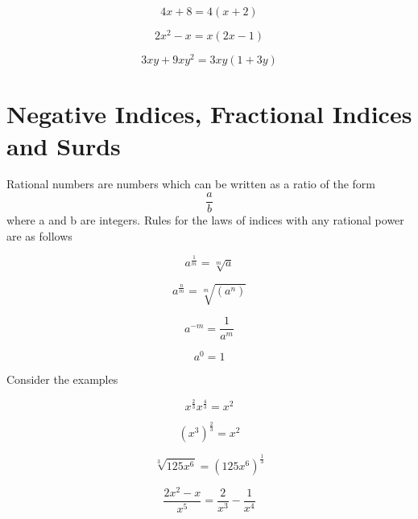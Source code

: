 \documentclass[11pt]{article}
\begin{document}
\begin{tcolorbox}[colback=green!5!white,colframe=green!75!black]
$$  4x+8=4(x+2)   $$\newline

$$  2x^2-x=x(2x-1)  $$\newline

$$  3xy+9xy^2=3xy(1+3y)  $$\newline
\end{tcolorbox}


\section{Negative Indices, Fractional Indices and Surds}\label{S5}
Rational numbers are numbers which can be written as a ratio of the form \newline
$$ \frac{a}{b}$$ where a and b are integers. Rules for the laws of indices with any rational power are as follows
\begin{tcolorbox}[colback=green!5!white,colframe=green!75!black]

$$  a^{\frac{1}{m}}=\sqrt[m]a  $$ \newline

$$   a^{\frac{n}{m}}=\sqrt[m]{(a^{n})}  $$ \newline


$$  a^{-m}=\frac{1}{a^{m}}  $$ \newline


$$  a^{0}=1  $$ \newline

\end{tcolorbox}

Consider the examples \newline
\begin{tcolorbox}[colback=green!5!white,colframe=green!75!black]
$$ x^{\frac{2}{3}}x^{\frac{4}{3}}=x^2$$ \newline

$$ (x^3)^{\frac{2}{3}}=x^2$$ \newline

$$  \sqrt[3]{125x^6}=(125x^6)^{\frac{1}{3}}  $$ \newline

$$  \frac{2x^2-x}{x^5} =\frac{2}{x^3}-\frac{1}{x^4}  $$ \newline
\end{tcolorbox}

\end{document}
